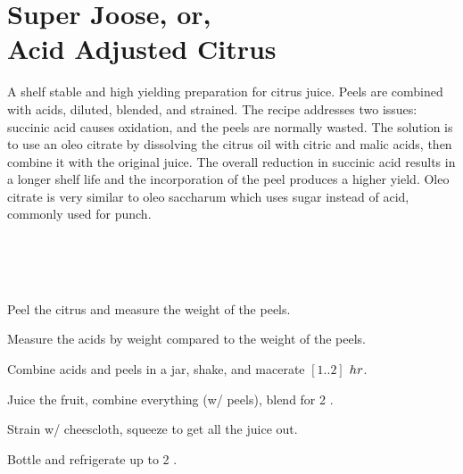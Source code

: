 \section[Super Joose]{Super Joose, or,\\Acid Adjusted Citrus}

\begin{recipestats}[
	servings=$\approx 12$ \fluidounce,
	preptime=30 \minute,
	inactivetime=2 \hour,
	original=\citeauthor{superJuiceKos} \cite{superJuiceKos},
]
\end{recipestats}


\begin{recipeabstract}
	A shelf stable and high yielding preparation for citrus juice.
	Peels are combined with acids, diluted, blended, and strained.
	The recipe addresses two issues: succinic acid causes oxidation, and the peels are normally wasted.
	The solution is to use an oleo citrate by dissolving the citrus oil with citric and malic acids, then combine it with the original juice.
	The overall reduction in succinic acid results in a longer shelf life and the incorporation of the peel produces a higher yield.
	Oleo citrate is very similar to oleo saccharum which uses sugar instead of acid, commonly used for punch\cite{oleoSaccharum}.
\end{recipeabstract}


\begin{ingredientcolumns}[1]
	\begin{ingredientblock}
		\\
		\\
		\\
	\end{ingredientblock}
\end{ingredientcolumns}


\begin{preparation}
\item Peel the citrus and measure the weight of the peels.
\item Measure the acids by weight compared to the weight of the peels.
\item Combine acids and peels in a jar, shake, and macerate $[1 .. 2]$ $\hour$.
\item Juice the fruit, combine everything (w/ peels), blend for 2 \minute.
\item Strain w/ cheescloth, squeeze to get all the juice out.
\item Bottle and refrigerate up to 2 \week.
\end{preparation}


